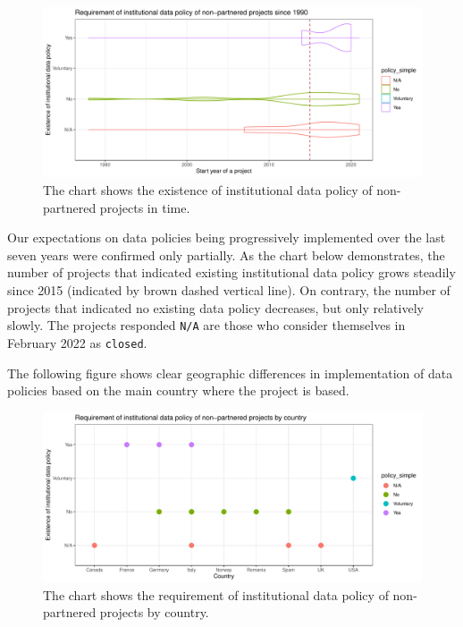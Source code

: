 \documentclass[
  10pt,
]{article}
\begin{document}
\begin{figure}

{\centering \includegraphics{01_FAIR_epi_report_files/figure-latex/unnamed-chunk-36-1} 

}

\caption{The chart shows the existence of institutional data policy of non-partnered projects in time.}\label{fig:unnamed-chunk-36}
\end{figure}

Our expectations on data policies being progressively implemented over
the last seven years were confirmed only partially. As the chart below
demonstrates, the number of projects that indicated existing
institutional data policy grows steadily since 2015 (indicated by brown
dashed vertical line). On contrary, the number of projects that
indicated no existing data policy decreases, but only relatively slowly.
The projects responded \texttt{N/A} are those who consider themselves in
February 2022 as \texttt{closed}.

The following figure shows clear geographic differences in
implementation of data policies based on the main country where the
project is based.

\begin{figure}

{\centering \includegraphics{01_FAIR_epi_report_files/figure-latex/unnamed-chunk-38-1} 

}

\caption{The chart shows the requirement of institutional data policy of non-partnered projects by country.}\label{fig:unnamed-chunk-38}
\end{figure}
\end{document}
